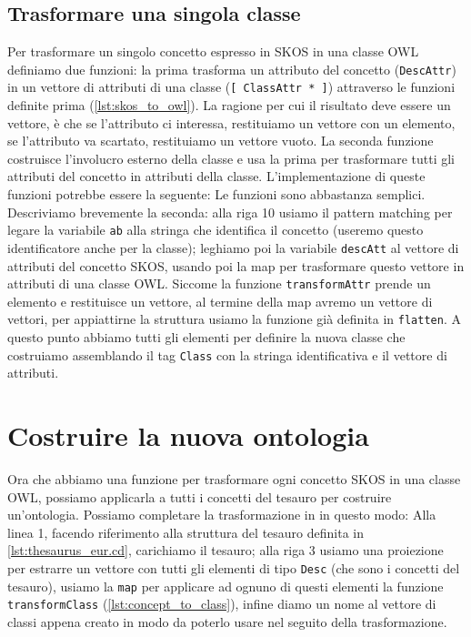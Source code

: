 \subsection{Trasformare una singola classe}
Per trasformare un singolo concetto espresso in SKOS in una classe OWL definiamo due funzioni: la prima trasforma un attributo del concetto (\verb|DescAttr|) in un vettore di attributi di una classe (\verb|[ ClassAttr * ]|) attraverso le funzioni definite prima (\ref{lst:skos_to_owl}). La ragione per cui il risultato deve essere un vettore, è che se l'attributo ci interessa, restituiamo un vettore con un elemento, se l'attributo va scartato, restituiamo un vettore vuoto. La seconda funzione costruisce l'involucro esterno della classe e usa la prima per trasformare tutti gli attributi del concetto in attributi della classe. L'implementazione di queste funzioni potrebbe essere la seguente:
Le funzioni sono abbastanza semplici. Descriviamo brevemente la seconda: alla riga 10 usiamo il pattern matching per legare la variabile \verb|ab| alla stringa che identifica il concetto (useremo questo identificatore anche per la classe); leghiamo poi la variabile \verb|descAtt| al vettore di attributi del concetto SKOS, usando poi la map per trasformare questo vettore in attributi di una classe OWL. Siccome la funzione \verb|transformAttr| prende un elemento e restituisce un vettore, al termine della map avremo un vettore di vettori, per appiattirne la struttura usiamo la funzione già definita in \cduce \verb|flatten|. A questo punto abbiamo tutti gli elementi per definire la nuova classe che costruiamo assemblando il tag \verb|Class| con la stringa identificativa e il vettore di attributi.
\section{Costruire la nuova ontologia}
Ora che abbiamo una funzione per trasformare ogni concetto SKOS in una classe OWL, possiamo applicarla a tutti i concetti del tesauro per costruire un'ontologia. Possiamo completare la trasformazione in \cduce in questo modo:
Alla linea 1, facendo riferimento alla struttura del tesauro definita in \ref{lst:thesaurus_eur.cd}, carichiamo il tesauro; alla riga 3 usiamo una proiezione per estrarre un vettore con tutti gli elementi di tipo \verb|Desc| (che sono i concetti del tesauro), usiamo la \verb|map| per applicare ad ognuno di questi elementi la funzione \verb|transformClass| (\ref{lst:concept_to_class}), infine diamo un nome al vettore di classi appena creato in modo da poterlo usare nel seguito della trasformazione.

